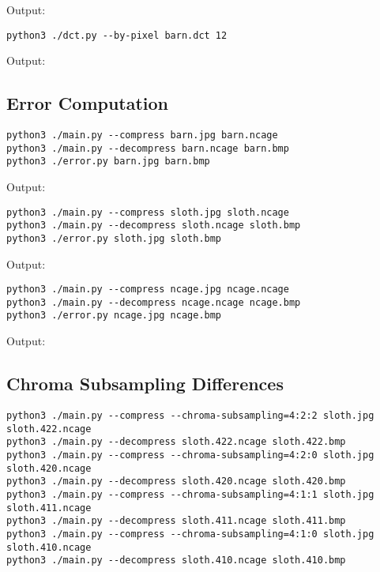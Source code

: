 \documentclass{article}
\begin{document}
\noindent Output:


\newpage
\begin{lstlisting}
python3 ./dct.py --by-pixel barn.dct 12
\end{lstlisting}

\noindent Output:


\subsection{Error Computation}

\begin{lstlisting}
python3 ./main.py --compress barn.jpg barn.ncage
python3 ./main.py --decompress barn.ncage barn.bmp
python3 ./error.py barn.jpg barn.bmp
\end{lstlisting}

\noindent Output:


\newpage
\begin{lstlisting}
python3 ./main.py --compress sloth.jpg sloth.ncage
python3 ./main.py --decompress sloth.ncage sloth.bmp
python3 ./error.py sloth.jpg sloth.bmp
\end{lstlisting}

\noindent Output:


\begin{lstlisting}
python3 ./main.py --compress ncage.jpg ncage.ncage
python3 ./main.py --decompress ncage.ncage ncage.bmp
python3 ./error.py ncage.jpg ncage.bmp
\end{lstlisting}

\noindent Output:





\subsection{Chroma Subsampling Differences}

\begin{lstlisting}
python3 ./main.py --compress --chroma-subsampling=4:2:2 sloth.jpg sloth.422.ncage
python3 ./main.py --decompress sloth.422.ncage sloth.422.bmp
python3 ./main.py --compress --chroma-subsampling=4:2:0 sloth.jpg sloth.420.ncage
python3 ./main.py --decompress sloth.420.ncage sloth.420.bmp
python3 ./main.py --compress --chroma-subsampling=4:1:1 sloth.jpg sloth.411.ncage
python3 ./main.py --decompress sloth.411.ncage sloth.411.bmp
python3 ./main.py --compress --chroma-subsampling=4:1:0 sloth.jpg sloth.410.ncage
python3 ./main.py --decompress sloth.410.ncage sloth.410.bmp
\end{lstlisting}
\end{document}
